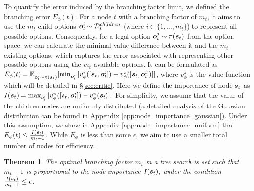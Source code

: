 To quantify the error induced by the branching factor limit, we defined the branching error \(E_{\phi}(t)\). For a node \(t\) with a branching factor of \(m_t\), it aims to use the \(m_t\) child options \({\bm{o}}_{t}^{i} \sim {\mathcal{D}}_{t}^{children}\) (where \(i \in \{1, \ldots, m_t\}\)) to represent all possible options. Consequently, for a legal option \({\bm{o}}_{t}^{j} \sim \pi({\bm{s}}_t)\) from the option space, we can calculate the minimal value difference between it and the \(m_t\) existing options, which captures the error associated with representing other possible options using the \(m_t\) available options. It can be formulated as 
$E_{\phi}(t) = \mathop{\mathbb{E}_{{\bm{o}}_t^{j}\sim \pi({\bm{s}}_t)}}[\min_{{\bm{o}}_{t}^{i}}|v_{\phi}^{\pi}([{\bm{s}}_t,{\bm{o}}_t^{j}])-v_{\phi}^{\pi}([{\bm{s}}_t,{\bm{o}}_t^{i}])|]$, where $v_{\phi}^{\pi}$ is the value function which will be detailed in \S \ref{sec:critic}. Here we define the importance of node ${\bm{s}}_t$ as $I({\bm{s}}_t) = \max_{{\bm{o}}_{t}^{i}} |v_{\phi}^{\pi}([{\bm{s}}_t,{\bm{o}}_t^{i}])- v_{\phi}^{\pi}({\bm{s}}_t)|.$ For simplicity, we assume that the value of the children nodes are uniformly distributed (a detailed analysis of the Gaussian distribution can be found in Appendix \ref{app:node_importance_gaussian}). Under this assumption, we show in Appendix \ref{app:node_importance_uniform} that $E_{\phi}(t) \le \frac{I({\bm{s}}_t)}{m_t-1}.$
While $E_{\phi}$ is less than some $\epsilon$, we aim to use a smaller total number of nodes for efficiency. 
\newtheorem{theorem}{Theorem}[section]
\begin{theorem}\label{thm:optimal_branching_factor}
The optimal branching factor $m_t$ in a tree search is set such that $m_t - 1$ is proportional to the node importance $I({\bm{s}}_t)$, under the condition $\frac{I({\bm{s}}_t)}{m_t-1} \le \epsilon$. 
\end{theorem}


